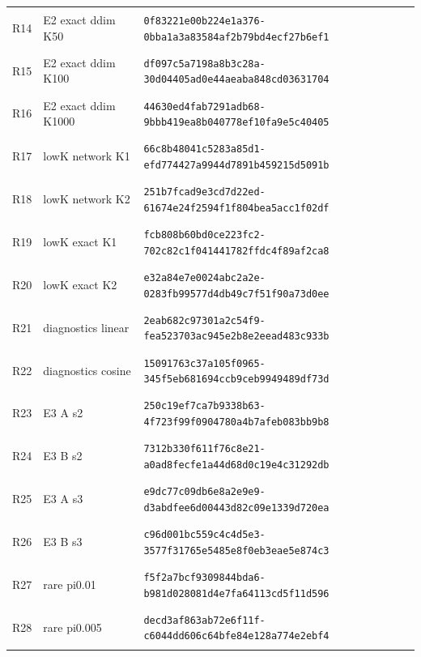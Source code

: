 \begin{longtable}{@{}l>{\raggedright\arraybackslash}p{3.5cm}p{10.8cm}@{}}
\hypertarget{R14}{R14} & E2 exact ddim K50 & {\fontsize{8.8}{11}\selectfont\texttt{0f83221e00b224e1a376-0bba1a3a83584af2b79bd4ecf27b6ef1}} \\
\hypertarget{R15}{R15} & E2 exact ddim K100 & {\fontsize{8.8}{11}\selectfont\texttt{df097c5a7198a8b3c28a-30d04405ad0e44aeaba848cd03631704}} \\
\hypertarget{R16}{R16} & E2 exact ddim K1000 & {\fontsize{8.8}{11}\selectfont\texttt{44630ed4fab7291adb68-9bbb419ea8b040778ef10fa9e5c40405}} \\
\hypertarget{R17}{R17} & lowK network K1 & {\fontsize{8.8}{11}\selectfont\texttt{66c8b48041c5283a85d1-efd774427a9944d7891b459215d5091b}} \\
\hypertarget{R18}{R18} & lowK network K2 & {\fontsize{8.8}{11}\selectfont\texttt{251b7fcad9e3cd7d22ed-61674e24f2594f1f804bea5acc1f02df}} \\
\hypertarget{R19}{R19} & lowK exact K1 & {\fontsize{8.8}{11}\selectfont\texttt{fcb808b60bd0ce223fc2-702c82c1f041441782ffdc4f89af2ca8}} \\
\hypertarget{R20}{R20} & lowK exact K2 & {\fontsize{8.8}{11}\selectfont\texttt{e32a84e7e0024abc2a2e-0283fb99577d4db49c7f51f90a73d0ee}} \\
\hypertarget{R21}{R21} & diagnostics linear & {\fontsize{8.8}{11}\selectfont\texttt{2eab682c97301a2c54f9-fea523703ac945e2b8e2eead483c933b}} \\
\hypertarget{R22}{R22} & diagnostics cosine & {\fontsize{8.8}{11}\selectfont\texttt{15091763c37a105f0965-345f5eb681694ccb9ceb9949489df73d}} \\
\hypertarget{R23}{R23} & E3 A s2 & {\fontsize{8.8}{11}\selectfont\texttt{250c19ef7ca7b9338b63-4f723f99f0904780a4b7afeb083bb9b8}} \\
\hypertarget{R24}{R24} & E3 B s2 & {\fontsize{8.8}{11}\selectfont\texttt{7312b330f611f76c8e21-a0ad8fecfe1a44d68d0c19e4c31292db}} \\
\hypertarget{R25}{R25} & E3 A s3 & {\fontsize{8.8}{11}\selectfont\texttt{e9dc77c09db6e8a2e9e9-d3abdfee6d00443d82c09e1339d720ea}} \\
\hypertarget{R26}{R26} & E3 B s3 & {\fontsize{8.8}{11}\selectfont\texttt{c96d001bc559c4c4d5e3-3577f31765e5485e8f0eb3eae5e874c3}} \\
\hypertarget{R27}{R27} & rare pi0.01 & {\fontsize{8.8}{11}\selectfont\texttt{f5f2a7bcf9309844bda6-b981d028081d4e7fa64113cd5f11d596}} \\
\hypertarget{R28}{R28} & rare pi0.005 & {\fontsize{8.8}{11}\selectfont\texttt{decd3af863ab72e6f11f-c6044dd606c64bfe84e128a774e2ebf4}} \\

\end{longtable}
